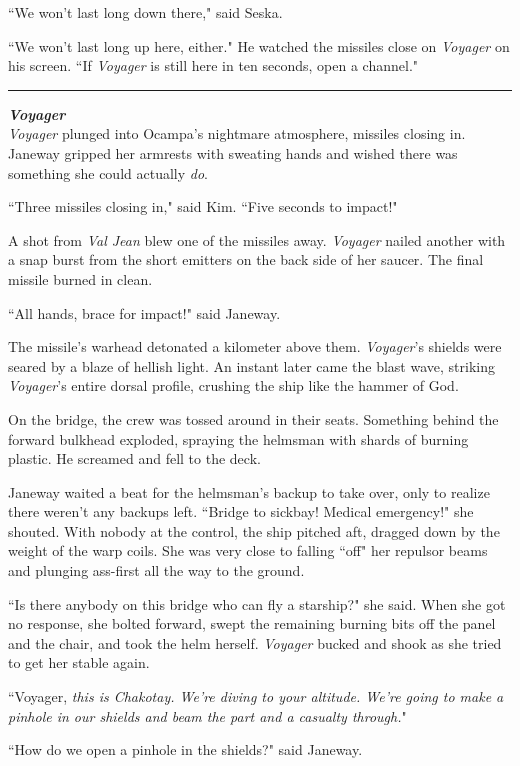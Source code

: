 \documentclass[twoside,letterpaper,12pt]{memoir}
\begin{document}
``We won't last long down there," said Seska.

``We won't last long up here, either." He watched the missiles close on \textit{Voyager} on his screen. ``If \textit{Voyager} is still here in ten seconds, open a channel."

\fancybreak{\rule{3cm}{0.4 pt}}
\noindent\textit{\textbf{Voyager}}\\

\textit{Voyager} plunged into Ocampa's nightmare atmosphere, missiles closing in. Janeway gripped her armrests with sweating hands and wished there was something she could actually \textit{do}.

``Three missiles closing in," said Kim. ``Five seconds to impact!"

A shot from \textit{Val Jean} blew one of the missiles away. \textit{Voyager} nailed another with a snap burst from the short emitters on the back side of her saucer. The final missile burned in clean.

``All hands, brace for impact!" said Janeway.

The missile's warhead detonated a kilometer above them. \textit{Voyager}'s shields were seared by a blaze of hellish light. An instant later came the blast wave, striking \textit{Voyager}'s entire dorsal profile, crushing the ship like the hammer of God.

On the bridge, the crew was tossed around in their seats. Something behind the forward bulkhead exploded, spraying the helmsman with shards of burning plastic. He screamed and fell to the deck.

Janeway waited a beat for the helmsman's backup to take over, only to realize there weren't any backups left. ``Bridge to sickbay! Medical emergency!" she shouted. With nobody at the control, the ship pitched aft, dragged down by the weight of the warp coils. She was very close to falling ``off" her repulsor beams and plunging ass-first all the way to the ground.

``Is there anybody on this bridge who can fly a starship?" she said. When she got no response, she bolted forward, swept the remaining burning bits off the panel and the chair, and took the helm herself. \textit{Voyager} bucked and shook as she tried to get her stable again.

``Voyager, \textit{this is Chakotay. We're diving to your altitude. We're going to make a pinhole in our shields and beam the part and a casualty through.}"

``How do we open a pinhole in the shields?" said Janeway.
\end{document}

